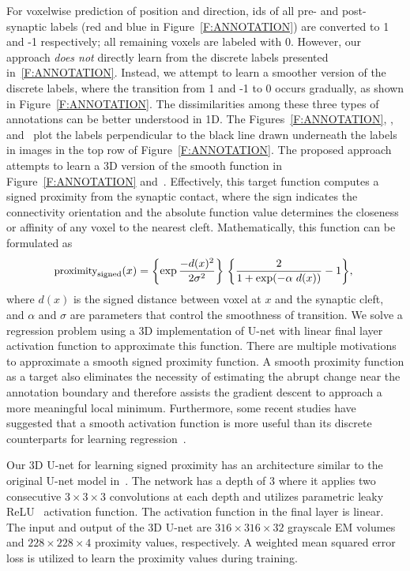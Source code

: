 \documentclass{llncs}
\begin{document}
For voxelwise prediction of position and direction, ids of all pre- and post-synaptic labels (red and blue in Figure~\ref{F:ANNOTATION}) are converted to 1 and -1 respectively; all remaining voxels are labeled with 0. However, our approach \emph{does not} directly learn from the discrete labels presented in~\ref{F:ANNOTATION}. Instead, we attempt to learn a smoother version of the discrete labels, where the transition from 1 and -1 to 0 occurs gradually, as shown in Figure~\ref{F:ANNOTATION}. The dissimilarities among these three types of annotations can be better understood in 1D. The Figures~\ref{F:ANNOTATION}, , and~ plot the labels perpendicular to the black line drawn underneath the labels in images in the top row of Figure~\ref{F:ANNOTATION}. The proposed approach attempts to learn a 3D version of the smooth function in Figure~\ref{F:ANNOTATION} and~. Effectively, this target function computes a signed proximity from the synaptic contact, where the sign indicates the connectivity orientation and the absolute function value determines the closeness or affinity of any voxel to the nearest cleft. Mathematically, this function can be formulated as
\vspace{-0.2cm}
\begin{equation}
\small \text{proximity}_\text{signed}(x) = \biggl \{\exp {- d(x)^2 \over {2 \sigma^2}} \biggr \} ~ \biggl \{ {2 \over {1 + \exp( - \alpha~ d(x))}} - 1 \biggr \}, ~ 
\vspace{-0.2cm}
\end{equation}
where $d(x)$ is the signed distance between voxel at $x$ and the synaptic cleft, and $\alpha$ and $\sigma$ are parameters that control the smoothness of transition. We solve a regression problem using a 3D implementation of U-net with linear final layer activation function to approximate this function.  There are multiple motivations to approximate a smooth signed proximity function. A smooth proximity function as a target also eliminates the necessity of estimating the abrupt change near the annotation boundary and therefore assists the gradient descent to approach a more meaningful local minimum.  Furthermore, some recent studies have suggested that a smooth activation function is more useful than its discrete counterparts for learning regression~\cite{hou17smooth}\cite{mobahi16}.  

Our 3D U-net for learning signed proximity has an architecture similar to the original U-net model in~\cite{ronneberger15unet}. The network has a depth of 3 where it applies two consecutive $3 \times 3 \times 3$ convolutions at each depth and utilizes parametric leaky ReLU~\cite{he15prelu} activation function. The activation function in the final layer is linear. The input and output of the 3D U-net are $316\times 316\times 32$ grayscale EM volumes and $228\times 228\times 4$ proximity values, respectively. A weighted mean squared error loss is utilized to learn the proximity values during training.
\end{document}
